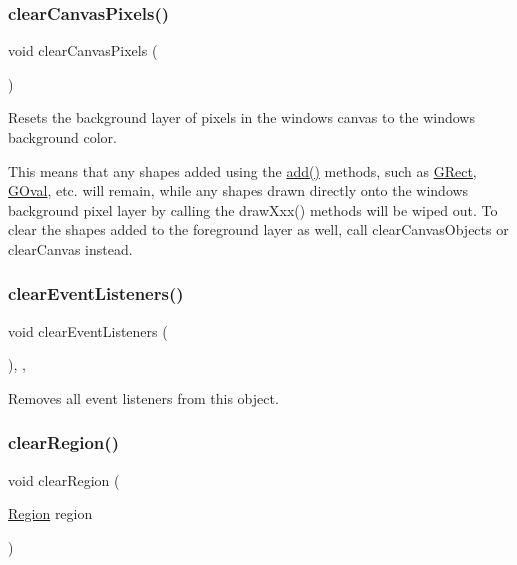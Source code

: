 \subsubsection{\texorpdfstring{clear\+Canvas\+Pixels()}{clearCanvasPixels()}}
{\footnotesize\ttfamily void clear\+Canvas\+Pixels (\begin{DoxyParamCaption}{ }\end{DoxyParamCaption})\hspace{0.3cm}{\ttfamily [virtual]}}



Resets the background layer of pixels in the window\textquotesingle{}s canvas to the window\textquotesingle{}s background color. 

This means that any shapes added using the \mbox{\hyperlink{classGWindow_a6f99b7c841256dbdc5acaafbbca4e685}{add()}} methods, such as \mbox{\hyperlink{classGRect}{G\+Rect}}, \mbox{\hyperlink{classGOval}{G\+Oval}}, etc. will remain, while any shapes drawn directly onto the window\textquotesingle{}s background pixel layer by calling the draw\+Xxx() methods will be wiped out. To clear the shapes added to the foreground layer as well, call clear\+Canvas\+Objects or clear\+Canvas instead. \mbox{\label{classGObservable_a80cfa040459ff53594adbd6a51ec8f43}} 
\subsubsection{\texorpdfstring{clear\+Event\+Listeners()}{clearEventListeners()}}
{\footnotesize\ttfamily void clear\+Event\+Listeners (\begin{DoxyParamCaption}{ }\end{DoxyParamCaption})\hspace{0.3cm}{\ttfamily [protected]}, {\ttfamily [virtual]}, {\ttfamily [inherited]}}



Removes all event listeners from this object. 

\mbox{\label{classGWindow_a47f0cc45498a78757fa4d0e6befc2981}} 
\subsubsection{\texorpdfstring{clear\+Region()}{clearRegion()}\hspace{0.1cm}{\footnotesize\ttfamily [1/2]}}
{\footnotesize\ttfamily void clear\+Region (\begin{DoxyParamCaption}\item[{\mbox{\hyperlink{classGWindow_a81a01a86de31071a92e6cce0bab9bc4b}{Region}}}]{region }\end{DoxyParamCaption})\hspace{0.3cm}{\ttfamily [virtual]}}



